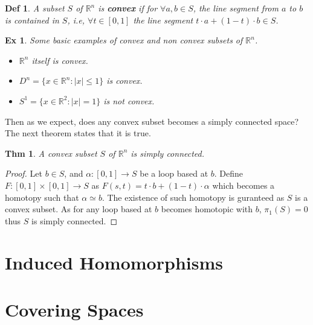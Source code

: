 \documentclass[paper=a4, fontsize=11pt]{scrartcl}
\newtheorem{theorem}{Thm}
\newtheorem{definition}{Def}
\newtheorem{example}{Ex}
\begin{document}
\begin{definition}
	A subset $S$ of $\mathbb{R}^n$ is \textbf{convex} if for $\forall a,b \in S$, the line segment from $a$ to $b$ is contained in $S$, i.e, $\forall t \in [0,1]$ the line segment $t\cdot a + (1-t)\cdot b \in S$.\\
\end{definition} 

\begin{example}
	Some basic examples of convex and non convex subsets of $\mathbb{R}^n$.
	\begin{itemize}
		\item $\mathbb{R}^n$ itself is convex.
		\item $D^n=\{x\in \mathbb{R}^n : |x|\leq 1 \}$ is convex.
		\item $S^1=\{x\in \mathbb{R}^2 : |x|=1\}$ is not convex.\\
	\end{itemize}
\end{example}

Then as we expect, does any convex subset becomes a simply connected space? The next theorem states that it is true.\\

\begin{theorem}
	A convex subset $S$ of $\mathbb{R}^n$ is simply connected.\\
\end{theorem}

\begin{proof}
	Let $b\in S$, and $\alpha:[0,1]\to S$ be a loop based at $b$. Define $F:[0,1]\times[0,1] \to S$ as $F(s,t)=t\cdot b + (1-t)\cdot \alpha$ which becomes a homotopy such that $\alpha \simeq b$. The existence of such homotopy is guranteed as $S$ is a convex subset. As for any loop based at $b$ becomes homotopic with $b$, $\pi_1(S)=0$ thus $S$ is simply connected.
\end{proof}
\section{Induced Homomorphisms}

\section{Covering Spaces}
\end{document}
